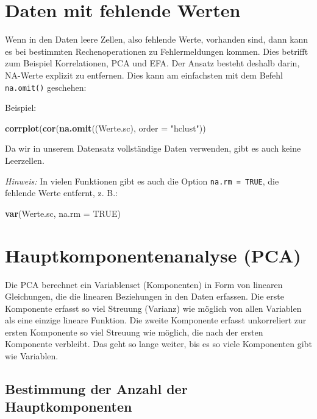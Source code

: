 \documentclass[12pt,ngerman,]{book}
\makeatletter
\newenvironment{Shaded}{\begin{snugshade}}{\end{snugshade}}
\newcommand{\KeywordTok}[1]{\textcolor[rgb]{0.13,0.29,0.53}{\textbf{{#1}}}}
\newcommand{\DataTypeTok}[1]{\textcolor[rgb]{0.13,0.29,0.53}{{#1}}}
\newcommand{\StringTok}[1]{\textcolor[rgb]{0.31,0.60,0.02}{{#1}}}
\newcommand{\OtherTok}[1]{\textcolor[rgb]{0.56,0.35,0.01}{{#1}}}
\newcommand{\NormalTok}[1]{{#1}}
\newenvironment{kframe}{%
\medskip{}
\setlength{\fboxsep}{.8em}
 \def\at@end@of@kframe{}%
 \ifinner\ifhmode%
  \def\at@end@of@kframe{\end{minipage}}%
  \begin{minipage}{\columnwidth}%
 \fi\fi%
 \def\FrameCommand##1{\hskip\@totalleftmargin \hskip-\fboxsep
 \colorbox{shadecolor}{##1}\hskip-\fboxsep
     \hskip-\linewidth \hskip-\@totalleftmargin \hskip\columnwidth}%
 \MakeFramed {\advance\hsize-\width
   \@totalleftmargin\z@ \linewidth\hsize
   \@setminipage}}%
 {\par\unskip\endMakeFramed%
 \at@end@of@kframe}
\renewenvironment{Shaded}{\begin{kframe}}{\end{kframe}}
\makeatother
\begin{document}
\section{Daten mit fehlende Werten}\label{daten-mit-fehlende-werten}

Wenn in den Daten leere Zellen, also fehlende Werte, vorhanden sind,
dann kann es bei bestimmten Rechenoperationen zu Fehlermeldungen kommen.
Dies betrifft zum Beispiel Korrelationen, PCA und EFA. Der Ansatz
besteht deshalb darin, NA-Werte explizit zu entfernen. Dies kann am
einfachsten mit dem Befehl \texttt{na.omit()} geschehen:

Beispiel:

\begin{Shaded}
\begin{Highlighting}[]
\KeywordTok{corrplot}\NormalTok{(}\KeywordTok{cor}\NormalTok{(}\KeywordTok{na.omit}\NormalTok{((Werte.sc), }\DataTypeTok{order =} \StringTok{"hclust"}\NormalTok{))}
\end{Highlighting}
\end{Shaded}

Da wir in unserem Datensatz vollständige Daten verwenden, gibt es auch
keine Leerzellen.

\emph{Hinweis:} In vielen Funktionen gibt es auch die Option
\texttt{na.rm\ =\ TRUE}, die fehlende Werte entfernt, z. B.:

\begin{Shaded}
\begin{Highlighting}[]
\KeywordTok{var}\NormalTok{(Werte.sc, }\DataTypeTok{na.rm =} \OtherTok{TRUE}\NormalTok{)}
\end{Highlighting}
\end{Shaded}

\section{Hauptkomponentenanalyse
(PCA)}\label{hauptkomponentenanalyse-pca}

Die PCA berechnet ein Variablenset (Komponenten) in Form von linearen
Gleichungen, die die linearen Beziehungen in den Daten erfassen. Die
erste Komponente erfasst so viel Streuung (Varianz) wie möglich von
allen Variablen als eine einzige lineare Funktion. Die zweite Komponente
erfasst unkorreliert zur ersten Komponente so viel Streuung wie möglich,
die nach der ersten Komponente verbleibt. Das geht so lange weiter, bis
es so viele Komponenten gibt wie Variablen.

\subsection{Bestimmung der Anzahl der
Hauptkomponenten}\label{bestimmung-der-anzahl-der-hauptkomponenten}
\end{document}
